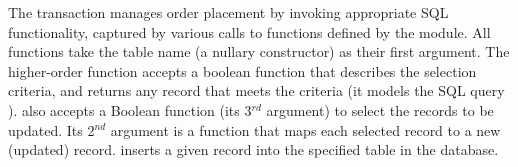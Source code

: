The transaction manages order placement by invoking appropriate SQL
functionality, captured by various calls to functions defined by the
 module. All  functions take the table name (a nullary
constructor) as their first argument. The higher-order 
function accepts a boolean function that describes the selection
criteria, and returns any record that meets the criteria (it models
the SQL query \C{SELECT \ldots\xspace LIMIT 1}).  also
accepts a Boolean function (its 3$^{rd}$ argument) to select the records to be
updated. Its 2$^{nd}$ argument is a function that maps each selected
record to a new (updated) record.  inserts a given
record into the specified table in the database.



